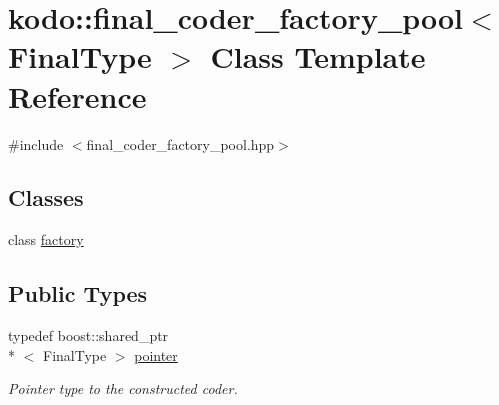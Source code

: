 \hypertarget{classkodo_1_1final__coder__factory__pool}{\section{kodo\-:\-:final\-\_\-coder\-\_\-factory\-\_\-pool$<$ Final\-Type $>$ Class Template Reference}
\label{classkodo_1_1final__coder__factory__pool}
}


{\ttfamily \#include $<$final\-\_\-coder\-\_\-factory\-\_\-pool.\-hpp$>$}

\subsection*{Classes}
\begin{DoxyCompactItemize}
\item 
class \hyperlink{classkodo_1_1final__coder__factory__pool_1_1factory}{factory}
\end{DoxyCompactItemize}
\subsection*{Public Types}
\begin{DoxyCompactItemize}
\item 
\hypertarget{classkodo_1_1final__coder__factory__pool_afa50091a69bbad9de46e96b1f64795bd}{typedef boost\-::shared\-\_\-ptr\\*
$<$ Final\-Type $>$ \hyperlink{classkodo_1_1final__coder__factory__pool_afa50091a69bbad9de46e96b1f64795bd}{pointer}}\label{classkodo_1_1final__coder__factory__pool_afa50091a69bbad9de46e96b1f64795bd}

\begin{DoxyCompactList}\small\item\em Pointer type to the constructed coder. \end{DoxyCompactList}\end{DoxyCompactItemize}
